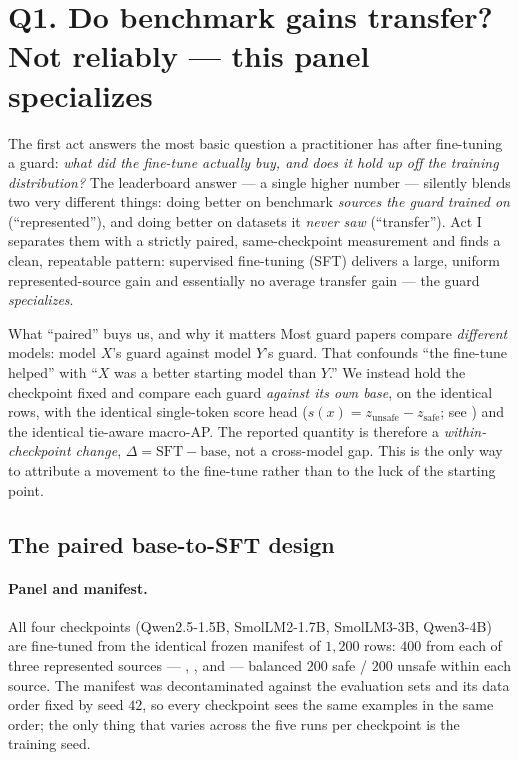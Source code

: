 \section{Q1. Do benchmark gains transfer? Not reliably --- this panel specializes}
\label{sec:actI}

The first act answers the most basic question a practitioner has after fine-tuning a guard:
\emph{what did the fine-tune actually buy, and does it hold up off the training distribution?} The
leaderboard answer --- a single higher number --- silently blends two very different things: doing
better on benchmark \emph{sources the guard trained on} (``represented''), and doing better on
datasets it \emph{never saw} (``transfer''). Act I separates them with a strictly paired,
same-checkpoint measurement and finds a clean, repeatable pattern: supervised fine-tuning (SFT)
delivers a large, uniform represented-source gain and essentially no average transfer gain --- the
guard \emph{specializes}.

\begin{background}{What ``paired'' buys us, and why it matters}
Most guard papers compare \emph{different} models: model $X$'s guard against model $Y$'s guard. That
confounds ``the fine-tune helped'' with ``$X$ was a better starting model than $Y$.'' We instead hold
the checkpoint fixed and compare each guard \emph{against its own base}, on the identical rows, with
the identical single-token score head ($s(x)=z_{\text{unsafe}}-z_{\text{safe}}$; see
) and the identical tie-aware macro-AP. The reported quantity is therefore a
\emph{within-checkpoint change}, $\Delta = \text{SFT} - \text{base}$, not a cross-model gap. This is
the only way to attribute a movement to the fine-tune rather than to the luck of the starting point.
\end{background}

\subsection{The paired base-to-SFT design}
\label{sec:actI-design}

\paragraph{Panel and manifest.} All four checkpoints (Qwen2.5-1.5B, SmolLM2-1.7B, SmolLM3-3B,
Qwen3-4B) are fine-tuned from the identical frozen manifest of $1{,}200$ rows: $400$ from each of three
represented sources --- , , and
 --- balanced $200$ safe / $200$ unsafe within each source. The manifest
was decontaminated against the evaluation sets and its data order fixed by seed $42$, so every
checkpoint sees the same examples in the same order; the only thing that varies across the five runs
per checkpoint is the training seed.

